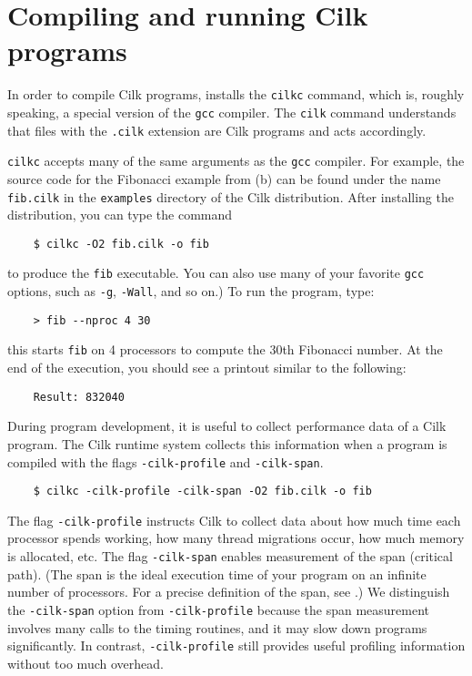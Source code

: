 \section{Compiling and running Cilk programs}
\label{sec:compile-run}

In order to compile Cilk programs, {\sysnameversion} installs the
\texttt{cilkc} command, which is, roughly speaking, a special version
of the \texttt{gcc} compiler.  The \texttt{cilk} command understands
that files with the \texttt{.cilk} extension are Cilk programs and
acts accordingly.

\texttt{cilkc} accepts many of the same arguments as the \texttt{gcc}
compiler.  For example, the source code for the Fibonacci example from
(b) can be found under the name {\tt fib.cilk} in the
\texttt{examples} directory of the Cilk distribution.  After
installing the distribution, you can type the command
\begin{verbatim}
    $ cilkc -O2 fib.cilk -o fib
\end{verbatim}%

to produce the \texttt{fib} executable.  You can also use many of your
favorite \texttt{gcc} options, such as \texttt{-g}, \texttt{-Wall},
and so on.)  To run the program, type:
\begin{verbatim}
    > fib --nproc 4 30 
\end{verbatim}
this starts \texttt{fib} on 4 processors to compute the 30th Fibonacci
number.  At the end of the execution, you should see a printout
similar to the following:

\begin{verbatim}
    Result: 832040
\end{verbatim}

\indextim{|(} 
During program development, it is useful to collect performance data
of a Cilk program.  The Cilk runtime system collects this information
when a program is compiled with the flags  \texttt{-cilk-profile}
and \texttt{-cilk-span}.
\begin{verbatim}
    $ cilkc -cilk-profile -cilk-span -O2 fib.cilk -o fib
\end{verbatim}%
The flag \texttt{-cilk-profile} instructs Cilk to collect data about
how much time each processor spends working, how many thread
migrations occur, how much memory is allocated, etc.  The flag
\texttt{-cilk-span} enables measurement of the span (critical
path).  (The span is the ideal execution time of your program on an
infinite number of processors.  For a precise definition of the span,
see .)  We distinguish the \texttt{-cilk-span}
option from \texttt{-cilk-profile} because the span measurement
involves many calls to the timing routines, and it may slow down
programs significantly.  In contrast, \texttt{-cilk-profile} still
provides useful profiling information without too much overhead.

